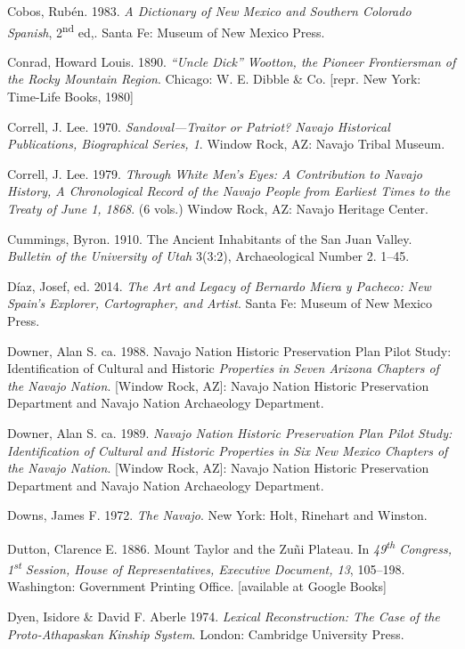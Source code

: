 \begin{hang}
	Cobos, Rubén. 1983.  \textit{A Dictionary of New Mexico and Southern Colorado Spanish}, 2\textsuperscript{nd} ed,.  Santa Fe:  Museum of New Mexico Press.

	Conrad, Howard Louis. 1890.  \textit{“Uncle Dick” Wootton, the Pioneer Frontiersman of the Rocky Mountain Region}.  Chicago:  W. E. Dibble \& Co.  [repr. New York:  Time-Life Books, 1980]

	Correll, J. Lee. 1970. \textit{Sandoval—Traitor or Patriot?  Navajo Historical Publications, Biographical Series, 1}.  Window Rock, AZ:  Navajo Tribal Museum.

	Correll, J. Lee. 1979.  \textit{Through White Men’s Eyes: A Contribution to Navajo History, A Chronological Record of the Navajo People from Earliest Times to the Treaty of June 1, 1868}. (6 vols.) Window Rock, AZ:  Navajo Heritage Center.

	Cummings, Byron. 1910.  The Ancient Inhabitants of the San Juan Valley.  \textit{Bulletin of the University of Utah} 3(3:2), Archaeological Number 2. 1--45.

	Díaz, Josef, ed. 2014. \textit{The Art and Legacy of Bernardo Miera y Pacheco: New Spain’s Explorer, Cartographer, and Artist}.  Santa Fe:  Museum of New Mexico Press.

	Downer, Alan S. ca. 1988.  Navajo Nation Historic Preservation Plan Pilot Study: Identification of Cultural and Historic\textit{ Properties in Seven Arizona Chapters of the Navajo Nation}.  [Window Rock, AZ]:  Navajo Nation Historic Preservation Department and Navajo Nation Archaeology Department.

	Downer, Alan S. ca. 1989. \textit{Navajo Nation Historic Preservation Plan Pilot Study: Identification of Cultural and Historic Properties in Six New Mexico Chapters of the Navajo Nation}.  [Window Rock, AZ]:  Navajo Nation Historic Preservation Department and Navajo Nation Archaeology Department.

	Downs, James F.  1972.  \textit{The Navajo}.  New York:  Holt, Rinehart and Winston.

	Dutton, Clarence E. 1886.  Mount Taylor and the Zuñi Plateau.  In \textit{49\textsuperscript{th} Congress, 1\textsuperscript{st} Session, House of Representatives, Executive Document, 13}, 105--198.  Washington:  Government Printing Office.  [available at Google Books]

	Dyen, Isidore \& David F. Aberle  1974. \textit{Lexical Reconstruction: The Case of the Proto-Athapaskan Kinship System}.  London:  Cambridge University Press.


\end{hang}
